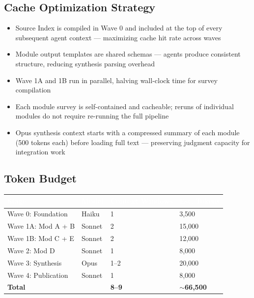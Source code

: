 \documentclass[11pt,letterpaper]{article}
\newcommand{\tableheader}[1]{\textbf{\sffamily\textcolor{white}{#1}}}
\begin{document}
\subsection{Cache Optimization Strategy}

\begin{itemize}[leftmargin=1.5em]
  \item Source Index is compiled in Wave 0 and included at the top of every subsequent agent context --- maximizing cache hit rate across waves
  \item Module output templates are shared schemas --- agents produce consistent structure, reducing synthesis parsing overhead
  \item Wave 1A and 1B run in parallel, halving wall-clock time for survey compilation
  \item Each module survey is self-contained and cacheable; reruns of individual modules do not require re-running the full pipeline
  \item Opus synthesis context starts with a compressed summary of each module (500 tokens each) before loading full text --- preserving judgment capacity for integration work
\end{itemize}

\subsection{Token Budget}

\begin{center}
\begin{tabularx}{\textwidth}{L{4cm}C{2cm}C{2cm}C{2cm}}
\toprule
{}
\tableheader{Stage} & \tableheader{Model} & \tableheader{Context Windows} & \tableheader{Est. Tokens} \\
\midrule
Wave 0: Foundation & Haiku & 1 & 3,500 \\
Wave 1A: Mod A + B & Sonnet & 2 & 15,000 \\
Wave 1B: Mod C + E & Sonnet & 2 & 12,000 \\
Wave 2: Mod D & Sonnet & 1 & 8,000 \\
Wave 3: Synthesis & Opus & 1--2 & 20,000 \\
Wave 4: Publication & Sonnet & 1 & 8,000 \\
\midrule
\textbf{Total} & & \textbf{8--9} & \textbf{$\sim$66,500} \\
\bottomrule
\end{tabularx}
\end{center}
\end{document}
